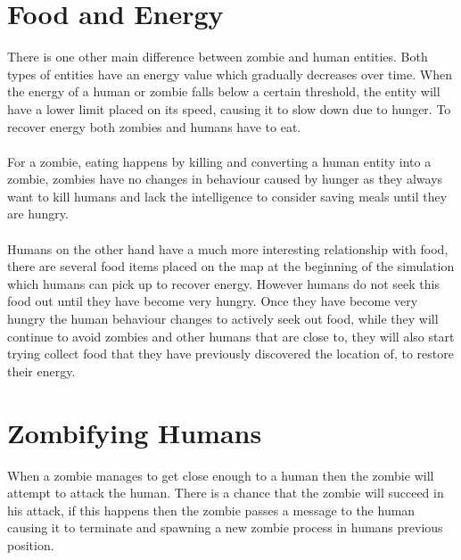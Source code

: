 \documentclass[10pt, a4paper, conference, compsocconf]{IEEEtran}
\begin{document}
\section{Food and Energy \label{food}}
There is one other main difference between zombie and human entities. Both types of entities have an energy value which gradually decreases over time. When the energy of a human or zombie falls below a certain threshold, the entity will have a lower limit placed on its speed, causing it to slow down due to hunger. To recover energy both zombies and humans have to eat.\\
\\
For a zombie, eating happens by killing and converting a human entity into a zombie, zombies have no changes in behaviour caused by hunger as they always want to kill humans and lack the intelligence to consider saving meals until they are hungry.\\
\\
Humans on the other hand have a much more interesting relationship with food, there are several food items placed on the map at the beginning of the simulation which humans can pick up to recover energy. However humans do not seek this food out until they have become very hungry. Once they have become very hungry the human behaviour changes to actively seek out food, while they will continue to avoid zombies and other humans that are close to, they will also start trying collect food that they have previously discovered the location of, to restore their energy.\\

\section{Zombifying Humans \label{zombifying}}
When a zombie manages to get close enough to a human then the zombie will attempt to attack the human. There is a chance that the zombie will succeed in his attack, if this happens then the zombie passes a message to the human causing it to terminate and spawning a new zombie process in humans previous position.\\
\end{document}
